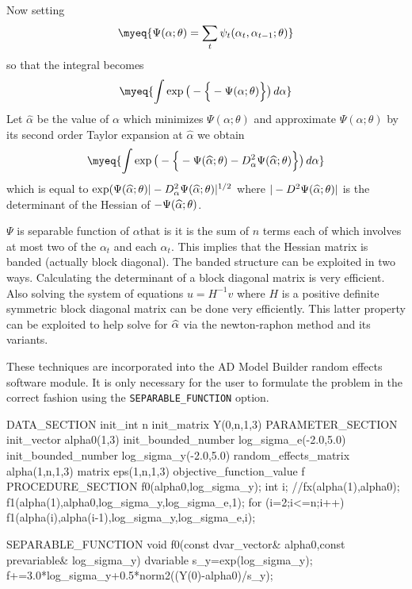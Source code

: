 Now setting 
\begin{equation}
 \myeq{
   \Psi(\alpha;\theta)=\sum_t \psi_t(\alpha_t,\alpha_{t-1};\theta)}
    \label{nlss:xx11}
\end{equation}
so that the integral becomes
\begin{equation}
 \myeq{
    \int \exp\big( -\Big\{-\Psi(\alpha;\theta)\Big\}\big)\,d\alpha}
    \label{nlss:xx12}
\end{equation}
Let $\widehat\alpha$ be the value of $\alpha$ which minimizes
    $\Psi(\alpha;\theta)$ and approximate $\Psi(\alpha;\theta)$ 
 by its second order Taylor expansion at 
$\widehat\alpha$ we obtain
\begin{equation}
 \myeq{
    \int \exp\big( -\Big\{-\Psi(\widehat\alpha;\theta) 
     - D^2_\alpha\Psi(\wha;\theta)\Big\}\big)\,d\alpha}
    \label{nlss:xx13}
\end{equation}
which is equal to $\exp(\Psi(\widehat\alpha;\theta)|-D^2_\alpha\Psi(\widehat\alpha;\theta)|^{1/2}$
where $|-D^2\Psi(\widehat\alpha;\theta)|$ is the 
determinant of the Hessian of $-\Psi(\widehat\alpha;\theta)$.

$\Psi$ is separable function of $\alpha$that is it is
the sum of $n$ terms each of which involves at most two of the $\alpha_t$ and
each $\alpha_t$. This implies that the Hessian 
matrix is  banded (actually block diagonal). The banded structure can be 
exploited in two ways. Calculating the determinant of a block diagonal matrix
is very efficient. Also solving the system of equations 
$u=H^{-1}v$ where $H$ is a positive definite symmetric block diagonal matrix
can be done very efficiently. This latter property can be exploited to
help solve for $\widehat\alpha$ via the newton-raphon method and its variants.
 
These techniques are incorporated into the AD Model Builder
random effects software module. It is only necessary for the user to
formulate the problem in the correct fashion using the 
{\tt SEPARABLE\_FUNCTION} option. 

\beginexampledf
DATA_SECTION
  init_int n
  init_matrix Y(0,n,1,3)
PARAMETER_SECTION
  init_vector alpha0(1,3)
  init_bounded_number log_sigma_e(-2.0,5.0)
  init_bounded_number log_sigma_y(-2.0,5.0)
  random_effects_matrix alpha(1,n,1,3)
  matrix eps(1,n,1,3)
  objective_function_value f
PROCEDURE_SECTION
  f0(alpha0,log_sigma_y);
  int i;
  //fx(alpha(1),alpha0);
  f1(alpha(1),alpha0,log_sigma_y,log_sigma_e,1);
  for (i=2;i<=n;i++)
  {
    f1(alpha(i),alpha(i-1),log_sigma_y,log_sigma_e,i);
  }

SEPARABLE_FUNCTION void f0(const dvar_vector& alpha0,const prevariable& log_sigma_y)
  dvariable s_y=exp(log_sigma_y);
  f+=3.0*log_sigma_y+0.5*norm2((Y(0)-alpha0)/s_y);
  
